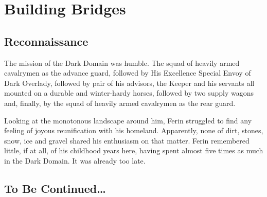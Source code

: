 \chapter{Building Bridges}

\section{Reconnaissance}

The mission of the Dark Domain was humble. The squad of heavily armed cavalrymen as the advance guard, followed by His Excellence Special Envoy of Dark Overlady, followed by pair of his advisors, the Keeper and his servants all mounted on a durable and winter-hardy horses, followed by two supply wagons and, finally, by the squad of heavily armed cavalrymen as the rear guard.

Looking at the monotonous landscape around him, Ferin struggled to find any feeling of joyous reunification with his homeland. Apparently, none of dirt, stones, snow, ice and gravel shared his enthusiasm on that matter. Ferin remembered little, if at all, of his childhood years here, having spent almost five times as much in the Dark Domain. It was already too late.

\section{To Be Continued\dots}